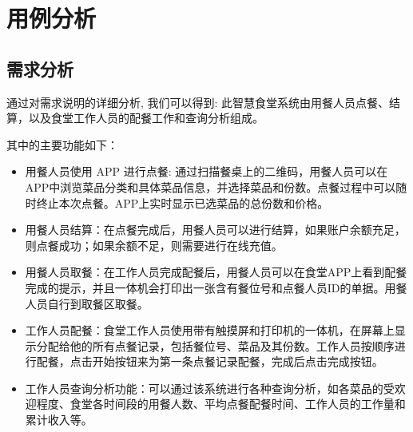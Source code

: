 \documentclass[../main.tex]{subfiles}
\begin{document}
%
\section{用例分析}
%
\subsection{需求分析}
通过对需求说明的详细分析, 我们可以得到:
此智慧食堂系统由用餐人员点餐、结算，以及食堂工作人员的配餐工作和查询分析组成。

其中的主要功能如下：
\begin{itemize}
  \item 用餐人员使用 APP 进行点餐:
    通过扫描餐桌上的二维码，用餐人员可以在APP中浏览菜品分类和具体菜品信息，并选择菜品和份数。点餐过程中可以随时终止本次点餐。APP上实时显示已选菜品的总份数和价格。
  \item 用餐人员结算：在点餐完成后，用餐人员可以进行结算，如果账户余额充足，则点餐成功；如果余额不足，则需要进行在线充值。
  \item 用餐人员取餐：在工作人员完成配餐后，用餐人员可以在食堂APP上看到配餐完成的提示，并且一体机会打印出一张含有餐位号和点餐人员ID的单据。用餐人员自行到取餐区取餐。
  \item 工作人员配餐：食堂工作人员使用带有触摸屏和打印机的一体机，在屏幕上显示分配给他的所有点餐记录，包括餐位号、菜品及其份数。工作人员按顺序进行配餐，点击开始按钮来为第一条点餐记录配餐，完成后点击完成按钮。
  \item 工作人员查询分析功能：可以通过该系统进行各种查询分析，如各菜品的受欢迎程度、食堂各时间段的用餐人数、平均点餐配餐时间、工作人员的工作量和累计收入等。
\end{itemize}
%
\end{document}
